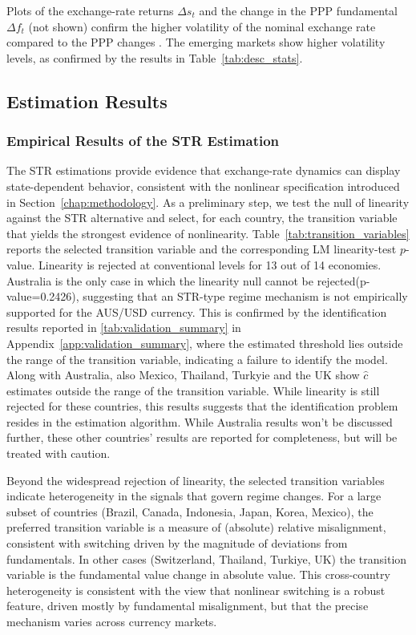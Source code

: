 \documentclass[a4paper,10pt,final]{article}    %
\begin{document}
Plots of the exchange-rate returns $\Delta s_t$ and the change in the PPP fundamental $\Delta f_t$ (not shown) confirm the higher volatility of the nominal exchange rate compared to the PPP changes \citep{EngelWest2005}. The emerging markets show higher volatility levels, as confirmed by the results in Table~\ref{tab:desc_stats}.


\subsection{Estimation Results}
\label{sec:baseline_all_z}

\subsubsection{Empirical Results of the STR Estimation}
\label{sec:str_results}

The STR estimations provide evidence that exchange-rate dynamics can display state-dependent behavior, consistent with the nonlinear specification introduced in Section~\ref{chap:methodology}. As a preliminary step, we test the null of linearity against the STR alternative and select, for each country, the transition variable that yields the strongest evidence of nonlinearity. Table~\ref{tab:transition_variables} reports the selected transition variable and the corresponding LM linearity-test $p$-value. Linearity is rejected at conventional levels for 13 out of 14 economies. Australia is the only case in which the linearity null cannot be rejected(p-value=0.2426), suggesting that an STR-type regime mechanism is not empirically supported for the AUS/USD currency. This is confirmed by the identification results reported in \ref{tab:validation_summary} in Appendix~\ref{app:validation_summary}, where the estimated threshold lies outside the range of the transition variable, indicating a failure to identify the model. Along with Australia, also Mexico, Thailand, Turkyie and the UK show $\hat c$ estimates outside the range of the transition variable. While linearity is still rejected for these countries, this results suggests that the identification problem resides in the estimation algorithm. While Australia results won't be discussed further, these other countries' results are reported for completeness, but will be treated with caution.

Beyond the widespread rejection of linearity, the selected transition variables indicate heterogeneity in the signals that govern regime changes. For a large subset of countries (Brazil, Canada, Indonesia, Japan, Korea, Mexico), the preferred transition variable is a measure of (absolute) relative misalignment, consistent with switching driven by the magnitude of deviations from fundamentals. In other cases (Switzerland, Thailand, Turkiye, UK) the transition variable is the fundamental value change in absolute value. This cross-country heterogeneity is consistent with the view that nonlinear switching is a robust feature, driven mostly by fundamental misalignment, but that the precise mechanism varies across currency markets.
\end{document}
